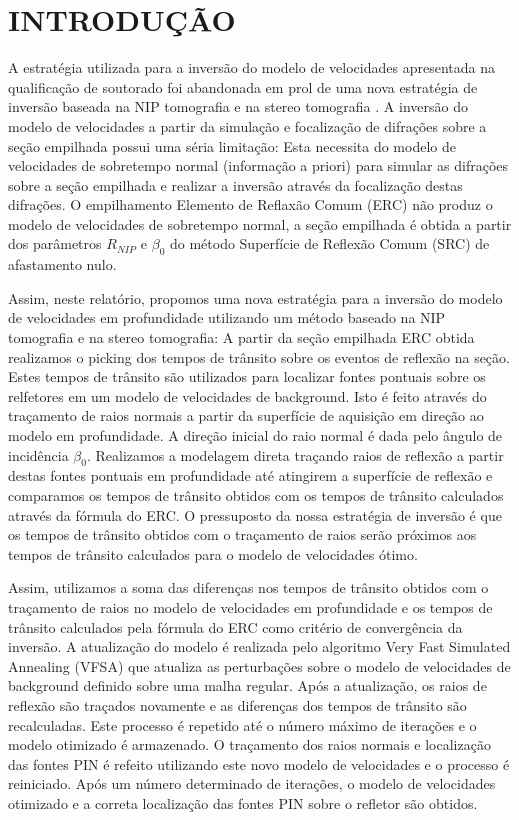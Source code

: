 \chapter{INTRODUÇÃO}
\label{cap1}

A estratégia utilizada para a inversão do modelo de velocidades apresentada na
qualificação de soutorado \cite{relatorio} foi abandonada em prol de uma nova estratégia de
inversão baseada na NIP tomografia e na stereo tomografia \cite{niptomo,stereo}.
A inversão do modelo de velocidades a partir da simulação e focalização
de difrações sobre a seção empilhada \cite{relatorio}  
possui uma séria limitação: Esta necessita do modelo de velocidades
de sobretempo normal (informação a priori) para simular as difrações sobre a seção empilhada e realizar a inversão através da focalização destas difrações. O empilhamento Elemento de Reflaxão Comum (ERC)
não produz o modelo de velocidades de sobretempo normal,
a seção empilhada é obtida a partir dos parâmetros $R_{NIP}$ e $\beta_0$ do método 
Superfície de Reflexão Comum (SRC) de afastamento nulo.

Assim, neste relatório, propomos uma nova estratégia para a inversão do modelo de velocidades em
profundidade utilizando um método baseado na NIP tomografia e na stereo tomografia: A partir da seção
empilhada ERC obtida \cite{relatorio} realizamos o picking dos tempos de trânsito sobre os eventos de
reflexão na seção. Estes tempos de trânsito são utilizados para localizar fontes pontuais sobre os relfetores
em um modelo de velocidades de background. Isto é feito através do traçamento de raios normais a partir
da superfície de aquisição em direção ao modelo em profundidade. A direção inicial do raio normal
é dada pelo ângulo de incidência $\beta_0$.
Realizamos a modelagem direta traçando raios de reflexão a partir destas fontes pontuais em profundidade
até atingirem a superfície de reflexão e comparamos os tempos de trânsito obtidos com os tempos de trânsito
calculados através da fórmula do ERC. O pressuposto da nossa estratégia de inversão é que os tempos
de trânsito obtidos com o traçamento de raios serão próximos aos tempos de trânsito calculados para
o modelo de velocidades ótimo.

Assim, utilizamos a soma das diferenças nos tempos de trânsito obtidos com o traçamento de raios
no modelo de velocidades em profundidade e os tempos de trânsito calculados pela fórmula do ERC como
critério de convergência da inversão. A atualização do modelo é realizada pelo algoritmo
Very Fast Simulated Annealing (VFSA) que atualiza as perturbações sobre o modelo de velocidades
de background definido sobre uma malha regular. Após a atualização, os raios de reflexão são
traçados novamente e as diferenças dos tempos de trânsito são recalculadas. Este processo é
repetido até o número máximo de iterações e o modelo otimizado é armazenado. O traçamento
dos raios normais e localização das fontes PIN é refeito utilizando este novo modelo de velocidades
e o processo é reiniciado. Após um número determinado de iterações, o modelo de velocidades otimizado 
e a correta localização das fontes PIN sobre o refletor são obtidos.

